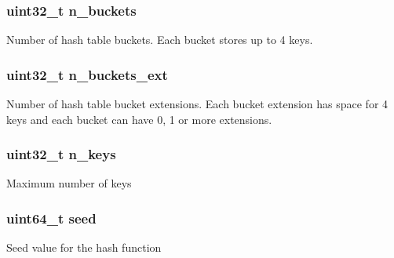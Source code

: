 \subsubsection[{n\+\_\+buckets}]{\setlength{\rightskip}{0pt plus 5cm}uint32\+\_\+t n\+\_\+buckets}\label{structrte__table__hash__ext__params_a241ccfe90f415a07cad8a881fc0f83ac}
Number of hash table buckets. Each bucket stores up to 4 keys. \hypertarget{structrte__table__hash__ext__params_a132da62c2f644cd61a43655ed0c887d7}{}
\subsubsection[{n\+\_\+buckets\+\_\+ext}]{\setlength{\rightskip}{0pt plus 5cm}uint32\+\_\+t n\+\_\+buckets\+\_\+ext}\label{structrte__table__hash__ext__params_a132da62c2f644cd61a43655ed0c887d7}
Number of hash table bucket extensions. Each bucket extension has space for 4 keys and each bucket can have 0, 1 or more extensions. \hypertarget{structrte__table__hash__ext__params_a4c48340399424293c79db3dc411e8231}{}
\subsubsection[{n\+\_\+keys}]{\setlength{\rightskip}{0pt plus 5cm}uint32\+\_\+t n\+\_\+keys}\label{structrte__table__hash__ext__params_a4c48340399424293c79db3dc411e8231}
Maximum number of keys \hypertarget{structrte__table__hash__ext__params_a13dfa5fcb8e1184f1f7756e717fd2807}{}
\subsubsection[{seed}]{\setlength{\rightskip}{0pt plus 5cm}uint64\+\_\+t seed}\label{structrte__table__hash__ext__params_a13dfa5fcb8e1184f1f7756e717fd2807}
Seed value for the hash function \hypertarget{structrte__table__hash__ext__params_a255e199334632db5019afe0eb166a05a}{}
